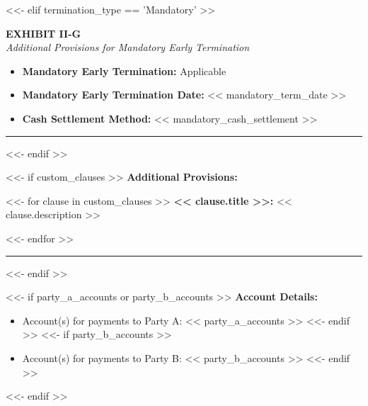 \documentclass[11pt, a4paper]{article}
\begin{document}
<<- elif termination_type == 'Mandatory' >>
\begin{center}
    \textbf{EXHIBIT II-G} \\
    \textit{Additional Provisions for Mandatory Early Termination}
\end{center}

\begin{itemize}[leftmargin=2cm, label={}, itemsep=3pt]
    \item \textbf{Mandatory Early Termination:} Applicable
    \item \textbf{Mandatory Early Termination Date:} << mandatory_term_date >>
    \item \textbf{Cash Settlement Method:} << mandatory_cash_settlement >>
\end{itemize}

\vspace{0.5cm}
\hrule
\vspace{0.5cm}

<<- endif >>


<<- if custom_clauses >>
\noindent \textbf{Additional Provisions:}
\vspace{0.2cm}

<<- for clause in custom_clauses >>
\noindent \textbf{<< clause.title >>:} << clause.description >>

\vspace{0.2cm}
<<- endfor >>
\vspace{0.3cm}
\hrule
\vspace{0.5cm}
<<- endif >>


<<- if party_a_accounts or party_b_accounts >>
\noindent \textbf{Account Details:}
\begin{itemize}[leftmargin=2cm, label={}, itemsep=3pt]
<<- if party_a_accounts >>
    \item Account(s) for payments to Party A: << party_a_accounts >>
<<- endif >>
<<- if party_b_accounts >>
    \item Account(s) for payments to Party B: << party_b_accounts >>
<<- endif >>
\end{itemize}
\vspace{0.3cm}
<<- endif >>
\end{document}
